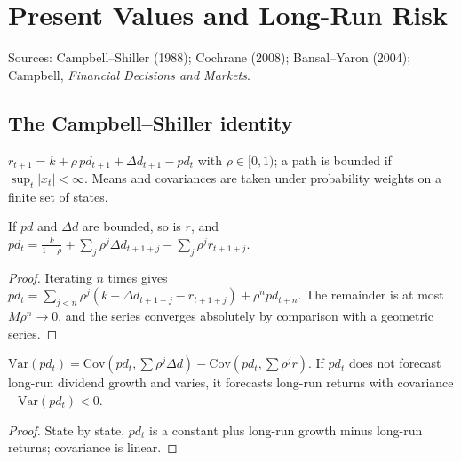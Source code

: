 \chapter{Present Values and Long-Run Risk}
\label{chap:asset_pricing_closed_forms}

Sources: Campbell--Shiller (1988); Cochrane (2008); Bansal--Yaron (2004); Campbell, \emph{Financial Decisions and Markets}.

\section{The Campbell--Shiller identity}

\begin{definition}
\label{def:cs}
\leanok
$r_{t+1}=k+\rho\,pd_{t+1}+\Delta d_{t+1}-pd_t$ with $\rho\in[0,1)$; a path is bounded if $\sup_t|x_t|<\infty$. Means and
covariances are taken under probability weights on a finite set of states.
\end{definition}

\begin{theorem}
\label{thm:cs_pv}
\leanok
{}
If $pd$ and $\Delta d$ are bounded, so is $r$, and
$pd_t=\frac{k}{1-\rho}+\sum_j\rho^j\Delta d_{t+1+j}-\sum_j\rho^jr_{t+1+j}$.
\end{theorem}
\begin{proof}
\leanok
Iterating $n$ times gives $pd_t=\sum_{j<n}\rho^j(k+\Delta d_{t+1+j}-r_{t+1+j})+\rho^npd_{t+n}$. The remainder is at most
$M\rho^n\to0$, and the series converges absolutely by comparison with a geometric series.
\end{proof}

\begin{theorem}
\label{thm:cs_var}
\leanok
{}
$\mathrm{Var}(pd_t)=\mathrm{Cov}(pd_t,\sum\rho^j\Delta d)-\mathrm{Cov}(pd_t,\sum\rho^jr)$. If $pd_t$ does not forecast
long-run dividend growth and varies, it forecasts long-run returns with covariance $-\mathrm{Var}(pd_t)<0$.
\end{theorem}
\begin{proof}
\leanok
State by state, $pd_t$ is a constant plus long-run growth minus long-run returns; covariance is linear.
\end{proof}

